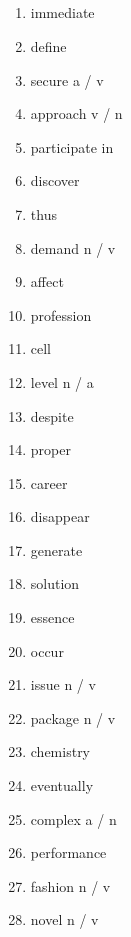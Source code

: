 \documentclass[10pt, a4paper, landscape]{oblivoir}
\begin{document}
\begin{multicols}{3}
    \section{}
    \begin{enumerate}
       \item immediate 
       \item define 
       \item secure a / v
       \item approach v / n
       \item participate in 
       \item discover 
       \item thus 
       \item demand n / v
       \item affect 
       \item profession 
       \item cell 
       \item level n / a
       \item despite 
       \item proper 
       \item career 
       \item disappear 
       \item generate 
       \item solution 
       \item essence 
       \item occur
       \item issue n / v
       \item package n / v
       \item chemistry 
       \item eventually 
       \item complex a / n
       \item performance 
       \item fashion n / v
       \item novel n / v

    \end{enumerate}



\end{multicols}
\end{document}
